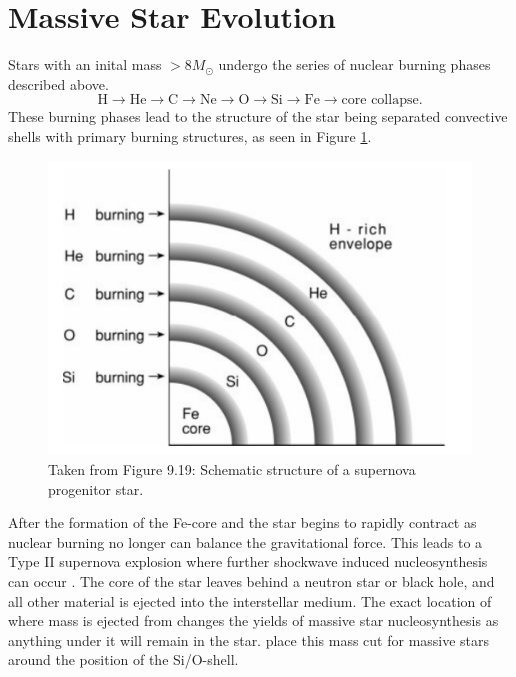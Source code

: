 \section{Massive Star Evolution}

Stars with an inital mass $>8 M_\odot$ undergo the series of nuclear burning phases described above.
\[
\mathrm{H} \rightarrow \mathrm{He} \rightarrow \mathrm{C} \rightarrow \mathrm{Ne} \rightarrow \mathrm{O} \rightarrow \mathrm{Si} \rightarrow \mathrm{Fe} \rightarrow \text{core collapse}.
\]
These burning phases lead to the structure of the star being separated convective shells with primary burning structures, as seen in Figure \ref{fig:Prialnik_Fig9.19}.
\begin{figure}[!htbp]
\includegraphics[width=\textwidth]{chapters/1/figures/Prialnik_Fig9.19.png}
\caption{Taken from \cite{prialnikIntroductionTheoryStellar2009} Figure 9.19: Schematic structure of a supernova progenitor star.
\label{fig:Prialnik_Fig9.19}}
\end{figure}

After the formation of the Fe-core and the star begins to rapidly contract as nuclear burning no longer can balance the gravitational force.
This leads to a Type II supernova explosion where further shockwave induced nucleosynthesis can occur \cite{prialnikIntroductionTheoryStellar2009}.
The core of the star leaves behind a neutron star or black hole, and all other material is ejected into the interstellar medium.
The exact location of where mass is ejected from changes the yields of massive star nucleosynthesis as anything under it will remain in the star.
\cite{ritterNuGridStellarData2018} place this mass cut for massive stars around the position of the Si/O-shell.

